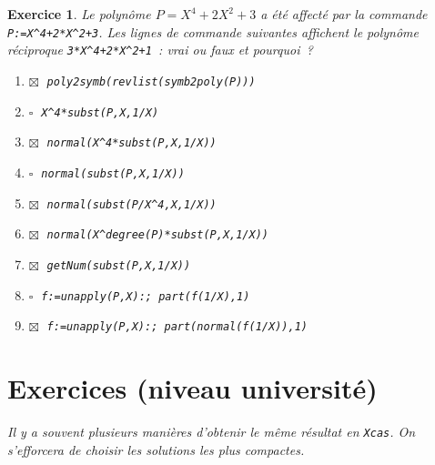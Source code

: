 \documentclass{article}
\newcommand{\faux}{$\square\;$}
\newcommand{\vrai}{$\boxtimes\;$}
\newcommand{\itemf}{\item\faux}
\newcommand{\itemvv}{\item\vrai}
\newtheorem{exo}{Exercice}[section]
\begin{document}
\begin{exo}{\rm
Le polyn\^ome $P=X^4+2X^2+3$ a \'et\'e affect\'e 
par la commande \verb|P:=X^4+2*X^2+3|.
Les lignes de commande suivantes affichent
le polyn\^ome r\'eciproque \verb|3*X^4+2*X^2+1|~: 
vrai ou faux et pourquoi~? 
\begin{enumerate}
\itemvv
\verb|poly2symb(revlist(symb2poly(P)))|
\itemf
\verb|X^4*subst(P,X,1/X)|
\itemvv
\verb|normal(X^4*subst(P,X,1/X))|
\itemf
\verb|normal(subst(P,X,1/X))|
\itemvv
\verb|normal(subst(P/X^4,X,1/X))|
\itemvv
\verb|normal(X^degree(P)*subst(P,X,1/X))|
\itemvv
\verb|getNum(subst(P,X,1/X))|
\itemf
\verb|f:=unapply(P,X):; part(f(1/X),1)|
\itemvv
\verb|f:=unapply(P,X):; part(normal(f(1/X)),1)|
\end{enumerate}
}\end{exo}

\section{Exercices (niveau universit\'e)}

{\it
Il y a souvent plusieurs mani\`eres d'obtenir le m\^eme r\'esultat en
{\tt Xcas}. On s'efforcera de choisir les solutions les plus compactes.
}
\end{document}
